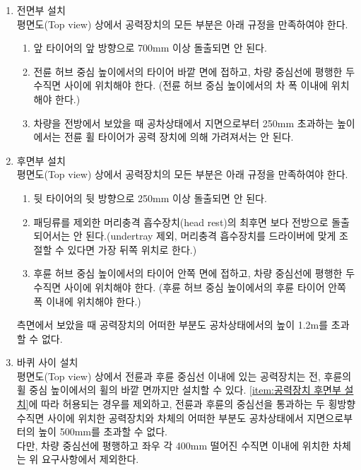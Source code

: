 \documentclass[final,a4paper,10pt]{report}
\begin{document}
\begin{enumerate}
  \item\label{rule:formula-technical.aerodynamics.front-installation} 전면부 설치\\
    평면도(Top view) 상에서 공력장치의 모든 부분은 아래 규정을 만족하여야 한다.
    \begin{enumerate}
      \item\label{rule:formula-technical.aerodynamics.front-installation.max-forward-overhang-700mm} 앞 타이어의 앞 방향으로 700mm 이상 돌출되면 안 된다.
      \item\label{rule:formula-technical.aerodynamics.front-installation.within-front-track-width} 전륜 허브 중심 높이에서의 타이어 바깥 면에 접하고, 차량 중심선에 평행한 두 수직면 사이에 위치해야 한다. (전륜 허브 중심 높이에서의 차 폭 이내에 위치해야 한다.)
      \item\label{rule:formula-technical.aerodynamics.front-installation.wheel-visibility-above-250mm} 차량을 전방에서 보았을 때 공차상태에서 지면으로부터 250mm 초과하는 높이에서는 전륜 휠 타이어가 공력 장치에 의해 가려져서는 안 된다.
    \end{enumerate}

  \item\label{rule:formula-technical.aerodynamics.rear-installation} 후면부 설치\\ \label{item:공력장치 후면부 설치}
    평면도(Top view) 상에서 공력장치의 모든 부분은 아래 규정을 만족하여야 한다.
    \begin{enumerate}
      \item\label{rule:formula-technical.aerodynamics.rear-installation.max-rear-overhang-250mm} 뒷 타이어의 뒷 방향으로 250mm 이상 돌출되면 안 된다.
      \item\label{rule:formula-technical.aerodynamics.rear-installation.behind-head-restraint} 패딩류를 제외한 머리충격 흡수장치(head rest)의 최후면 보다 전방으로 돌출되어서는 안 된다.(undertray 제외, 머리충격 흡수장치를 드라이버에 맞게 조절할 수 있다면 가장 뒤쪽 위치로 한다.)
      \item\label{rule:formula-technical.aerodynamics.rear-installation.within-rear-inner-width} 후륜 허브 중심 높이에서의 타이어 안쪽 면에 접하고, 차량 중심선에 평행한 두 수직면 사이에 위치해야 한다. (후륜 허브 중심 높이에서의 후륜 타이어 안쪽 폭 이내에 위치해야 한다.)
    \end{enumerate}
    측면에서 보았을 때 공력장치의 어떠한 부분도 공차상태에서의 높이 1.2m를 초과할 수 없다.

  \item\label{rule:formula-technical.aerodynamics.between-axle-height-500mm} 바퀴 사이 설치\\
    평면도(Top view) 상에서 전륜과 후륜 중심선 이내에 있는 공력장치는 전, 후륜의 휠 중심 높이에서의 휠의 바깥 면까지만 설치할 수 있다. \ref{item:공력장치 후면부 설치}에 따라 허용되는 경우를 제외하고, 전륜과 후륜의 중심선을 통과하는 두 횡방향 수직면 사이에 위치한 공력장치와 차체의 어떠한 부분도 공차상태에서 지면으로부터의 높이 500mm를 초과할 수 없다.\\
    다만, 차량 중심선에 평행하고 좌우 각 400mm 떨어진 수직면 이내에 위치한 차체는 위 요구사항에서 제외한다.


\end{enumerate}
\end{document}
